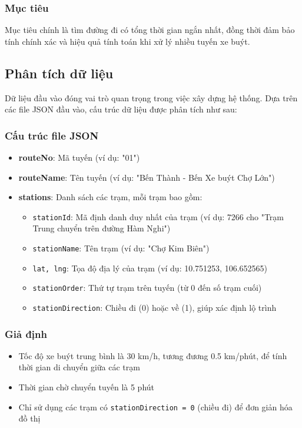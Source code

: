\documentclass[a4paper,12pt]{article}
\begin{document}
\subsubsection{Mục tiêu}
Mục tiêu chính là tìm đường đi có tổng thời gian ngắn nhất, đồng thời đảm bảo tính chính xác và hiệu quả tính toán khi xử lý nhiều tuyến xe buýt.


\subsection{Phân tích dữ liệu}
Dữ liệu đầu vào đóng vai trò quan trọng trong việc xây dựng hệ thống. Dựa trên các file JSON đầu vào, cấu trúc dữ liệu được phân tích như sau:

\subsubsection{Cấu trúc file JSON}
\begin{itemize}
    \item \textbf{routeNo}: Mã tuyến (ví dụ: "01")
    \item \textbf{routeName}: Tên tuyến (ví dụ: "Bến Thành - Bến Xe buýt Chợ Lớn")
    \item \textbf{stations}: Danh sách các trạm, mỗi trạm bao gồm:
    \begin{itemize}
        \item \texttt{stationId}: Mã định danh duy nhất của trạm (ví dụ: 7266 cho "Trạm Trung chuyển trên đường Hàm Nghi")
        \item \texttt{stationName}: Tên trạm (ví dụ: "Chợ Kim Biên")
        \item \texttt{lat, lng}: Tọa độ địa lý của trạm (ví dụ: 10.751253, 106.652565)
        \item \texttt{stationOrder}: Thứ tự trạm trên tuyến (từ 0 đến số trạm cuối)
        \item \texttt{stationDirection}: Chiều đi (0) hoặc về (1), giúp xác định lộ trình
    \end{itemize}
\end{itemize}

\subsubsection{Giả định}
\begin{itemize}
    \item Tốc độ xe buýt trung bình là 30 km/h, tương đương 0.5 km/phút, để tính thời gian di chuyển giữa các trạm
    \item Thời gian chờ chuyển tuyến là 5 phút
    \item Chỉ sử dụng các trạm có \texttt{stationDirection = 0} (chiều đi) để đơn giản hóa đồ thị
\end{itemize}
\end{document}
